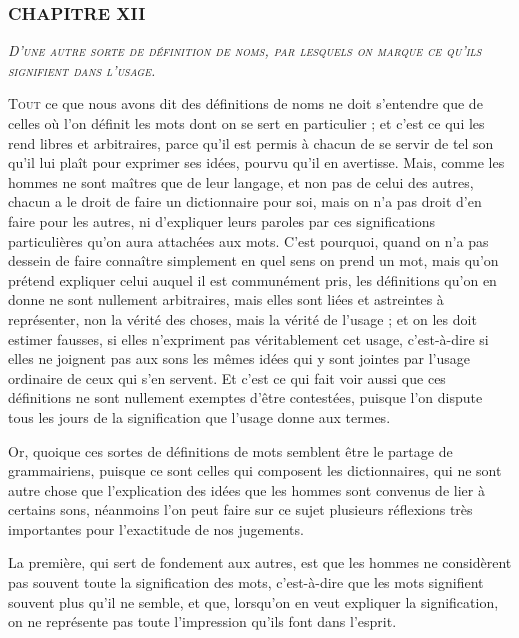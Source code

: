 \subsubsection{\centering \Large CHAPITRE XII}
\begin{center}\emph{\large\scshape D'une autre sorte de définition de noms, par lesquels on marque ce qu'ils signifient dans l'usage.}\end{center}

	\lettrine{T}{out} ce que nous avons dit des définitions de noms ne doit s'entendre que de celles où l'on définit les mots dont on se sert en particulier ; et c'est ce qui les rend libres et arbitraires, parce qu'il est permis à chacun de se servir de tel son qu'il lui plaît pour exprimer ses idées, pourvu qu'il en avertisse. Mais, comme les hommes ne sont maîtres que de leur langage, et non pas de celui des autres, chacun a le droit de faire un dictionnaire pour soi,	mais on n'a pas droit d'en faire pour les autres, ni d'expliquer leurs paroles par ces significations particulières qu'on aura attachées aux mots. C'est pourquoi, quand on n'a pas dessein de faire connaître simplement en quel sens on prend un mot, mais qu'on prétend expliquer celui auquel il est communément pris, les définitions qu'on en donne ne sont nullement arbitraires, mais elles sont liées et astreintes à représenter, non la vérité des choses, mais la vérité de l'usage ; et on les doit estimer fausses, si elles n'expriment pas véritablement cet usage, c'est-à-dire si elles ne joignent pas aux sons les mêmes idées qui y sont jointes par l'usage ordinaire de ceux qui s'en servent. Et c'est ce qui fait voir aussi que ces définitions ne sont nullement exemptes d'être contestées, puisque l'on dispute tous les jours de la signification que l'usage donne aux termes.

Or, quoique ces sortes de définitions de mots semblent être le partage de grammairiens, puisque ce sont celles qui composent les dictionnaires, qui ne sont autre chose que l'explication des idées que les hommes sont convenus de lier à certains sons, néanmoins l'on peut faire sur ce sujet plusieurs réflexions très importantes pour l'exactitude de nos jugements.

La première, qui sert de fondement aux autres, est que les hommes ne considèrent pas souvent toute la signification des mots, c'est-à-dire que les mots signifient souvent plus qu'il ne semble, et que, lorsqu'on en veut expliquer la signification, on ne représente pas toute l'impression qu'ils font dans l'esprit.

